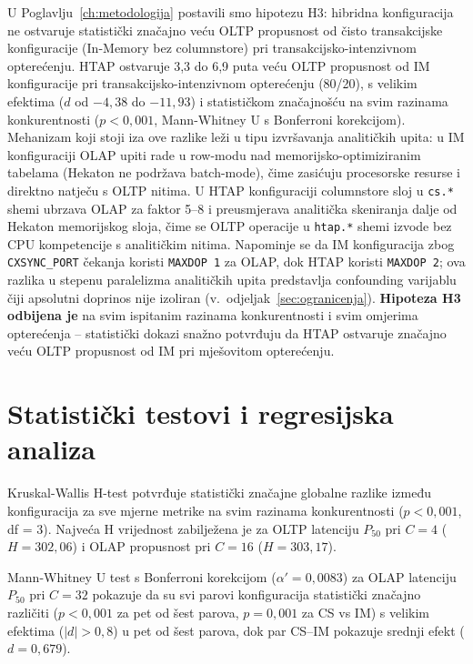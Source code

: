 U Poglavlju~\ref{ch:metodologija} postavili smo hipotezu H3: hibridna konfiguracija ne ostvaruje statistički značajno veću OLTP propusnost od čisto transakcijske konfiguracije (In-Memory bez columnstore) pri transakcijsko-intenzivnom opterećenju. HTAP ostvaruje 3,3 do 6,9 puta veću OLTP propusnost od IM konfiguracije pri transakcijsko-intenzivnom opterećenju (80/20), s velikim efektima ($d$ od $-4,38$ do $-11,93$) i statističkom značajnošću na svim razinama konkurentnosti ($p < 0,001$, Mann-Whitney U s Bonferroni korekcijom). Mehanizam koji stoji iza ove razlike leži u tipu izvršavanja analitičkih upita: u IM konfiguraciji OLAP upiti rade u row-modu nad memorijsko-optimiziranim tabelama (Hekaton ne podržava batch-mode), čime zasićuju procesorske resurse i direktno natječu s OLTP nitima. U HTAP konfiguraciji columnstore sloj u \texttt{cs.*} shemi ubrzava OLAP za faktor 5--8 i preusmjerava analitička skeniranja dalje od Hekaton memorijskog sloja, čime se OLTP operacije u \texttt{htap.*} shemi izvode bez CPU kompetencije s analitičkim nitima. Napominje se da IM konfiguracija zbog \texttt{CXSYNC\_PORT} čekanja koristi \texttt{MAXDOP 1} za OLAP, dok HTAP koristi \texttt{MAXDOP 2}; ova razlika u stepenu paralelizma analitičkih upita predstavlja confounding varijablu čiji apsolutni doprinos nije izoliran (v.\ odjeljak~\ref{sec:ogranicenja}). \textbf{Hipoteza H3 odbijena je} na svim ispitanim razinama konkurentnosti i svim omjerima opterećenja -- statistički dokazi snažno potvrđuju da HTAP ostvaruje značajno veću OLTP propusnost od IM pri mješovitom opterećenju.

\section{Statistički testovi i regresijska analiza}
\label{sec:statisticki_testovi}

Kruskal-Wallis H-test potvrđuje statistički značajne globalne razlike između konfiguracija za sve mjerne metrike na svim razinama konkurentnosti ($p < 0,001$, df = 3). Najveća H vrijednost zabilježena je za OLTP latenciju $P_{50}$ pri $C=4$ ($H=302,06$) i OLAP propusnost pri $C=16$ ($H=303,17$).

Mann-Whitney U test s Bonferroni korekcijom ($\alpha' = 0,0083$) za OLAP latenciju $P_{50}$ pri $C=32$ pokazuje da su svi parovi konfiguracija statistički značajno različiti ($p < 0,001$ za pet od šest parova, $p = 0,001$ za CS vs IM) s velikim efektima ($|d| > 0,8$) u pet od šest parova, dok par CS--IM pokazuje srednji efekt ($d = 0,679$).

